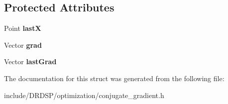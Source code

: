 \subsection*{Protected Attributes}
\begin{DoxyCompactItemize}
\item 
\hypertarget{struct_d_r_d_s_p_1_1_conjugate_gradient_a8f7ae6f524c01551e8e49e3d7b817029}{Point {\bfseries last\-X}}\label{struct_d_r_d_s_p_1_1_conjugate_gradient_a8f7ae6f524c01551e8e49e3d7b817029}

\item 
\hypertarget{struct_d_r_d_s_p_1_1_conjugate_gradient_a26a670a4537d7da7cf27664fbbc1f004}{Vector {\bfseries grad}}\label{struct_d_r_d_s_p_1_1_conjugate_gradient_a26a670a4537d7da7cf27664fbbc1f004}

\item 
\hypertarget{struct_d_r_d_s_p_1_1_conjugate_gradient_adf3802e381b2d39ba60238594dd6e2e2}{Vector {\bfseries last\-Grad}}\label{struct_d_r_d_s_p_1_1_conjugate_gradient_adf3802e381b2d39ba60238594dd6e2e2}

\end{DoxyCompactItemize}


The documentation for this struct was generated from the following file\-:\begin{DoxyCompactItemize}
\item 
include/\-D\-R\-D\-S\-P/optimization/conjugate\-\_\-gradient.\-h\end{DoxyCompactItemize}
